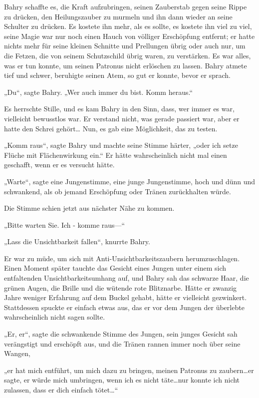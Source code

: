 {Bahry schaffte es, die Kraft aufzubringen, seinen Zauberstab gegen seine Rippe zu drücken, den Heilungszauber zu murmeln und ihn dann wieder an seine Schulter zu drücken. Es kostete ihn mehr, als es sollte, es kostete ihn viel zu viel, seine Magie war nur noch einen Hauch von völliger Erschöpfung entfernt; er hatte nichts mehr für seine kleinen Schnitte und Prellungen übrig oder auch nur, um die Fetzen, die von seinem Schutzschild übrig waren, zu verstärken. Es war alles, was er tun konnte, um seinen Patronus nicht erlöschen zu lassen. Bahry atmete tief und schwer, beruhigte seinen Atem, so gut er konnte, bevor er sprach.

„Du“, sagte Bahry. „Wer auch immer du bist. Komm heraus.“

Es herrschte Stille, und es kam Bahry in den Sinn, dass, wer immer es war, vielleicht bewusstlos war. Er verstand nicht, was gerade passiert war, aber er hatte den Schrei gehört… Nun, es gab eine Möglichkeit, das zu testen.

„Komm raus“, sagte Bahry und machte seine Stimme härter, „oder ich setze Flüche mit Flächenwirkung ein.“ Er hätte wahrscheinlich nicht mal einen geschafft, wenn er es versucht hätte.

„Warte“, sagte eine Jungenstimme, eine junge Jungenstimme, hoch und dünn und schwankend, als ob jemand Erschöpfung oder Tränen zurückhalten würde.

Die Stimme schien jetzt aus nächster Nähe zu kommen.

„Bitte warten Sie. Ich - komme raus—“

„Lass die Unsichtbarkeit fallen“, knurrte Bahry.

Er war zu müde, um sich mit Anti-Unsichtbarkeitszaubern herumzuschlagen. Einen Moment später tauchte das Gesicht eines Jungen unter einem sich entfaltenden Unsichtbarkeitsumhang auf, und Bahry sah das schwarze Haar, die grünen Augen, die Brille und die wütende rote Blitznarbe. Hätte er zwanzig Jahre weniger Erfahrung auf dem Buckel gehabt, hätte er vielleicht gezwinkert. Stattdessen spuckte er einfach etwas aus, das er vor dem Jungen der überlebte wahrscheinlich nicht sagen sollte.

„Er, er“, sagte die schwankende Stimme des Jungen, sein junges Gesicht sah verängstigt und erschöpft aus, und die Tränen rannen immer noch über seine Wangen,

„er hat mich entführt, um mich dazu zu bringen, meinen Patronus zu zaubern…er sagte, er würde mich umbringen, wenn ich es nicht täte…nur konnte ich nicht zulassen, dass er dich einfach tötet…“

}
